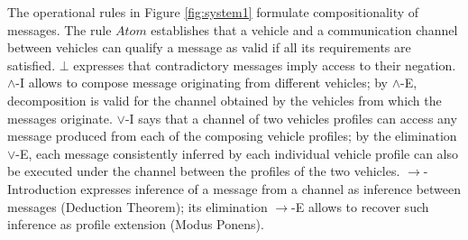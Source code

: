 \documentclass[compsoc, conference, letterpaper, 10pt, times]{IEEEtran}
\begin{document}
The operational rules in Figure \ref{fig:system1} formulate compositionality of messages. The rule $Atom$ establishes that a vehicle and a communication channel between vehicles can qualify a message as valid if all its requirements are satisfied. $\bot$ expresses that contradictory messages imply access to their negation. $\wedge$-I allows to compose message originating from different vehicles; by $\wedge$-E, decomposition is valid for the channel obtained by the vehicles from which the messages originate. $\vee$-I says that a channel of two vehicles profiles can access any message produced from each of the composing vehicle profiles; by the elimination $\vee$-E, each message consistently inferred by each individual vehicle profile can also be executed under the channel between the profiles of the two vehicles. $\rightarrow$-Introduction expresses inference of a message from a channel as inference between messages (Deduction Theorem); its elimination $\rightarrow$-E allows to recover such inference as profile extension (Modus Ponens).
\end{document}
